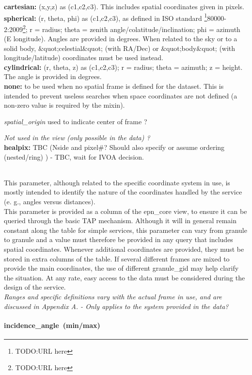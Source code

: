 \documentclass[11pt,a4paper]{ivoa}
\begin{document}
\textbf{cartesian:} (x,y,z) as (c1,c2,c3). This includes spatial coordinates given in pixels.\\ \textbf{spherical:} (r, theta, phi) as (c1,c2,c3), as defined in ISO standard \footnote{TODO:URL here}80000-2:2009\footnote{TODO:URL here}; r = radius; theta = zenith angle/colatitude/inclination; phi = azimuth (E longitude). Angles are provided in degrees. When related to the sky or to a solid body, \&quot;celestial\&quot; (with RA/Dec) or \&quot;body\&quot; (with longitude/latitude) coordinates must be used instead. \\\textbf{cylindrical:} (r, theta, z) as (c1,c2,c3); r = radius; theta = azimuth; z = height. The angle is provided in degrees.\\\textbf{none:} to be used when no spatial frame is defined for the dataset. This is intended to prevent useless searches when space coordinates are not defined (a non-zero value is required by the mixin).

\emph{spatial\_origin} used to indicate center of frame ?

\emph{Not used in the view (only possible in the data) ?}\\ \textbf{healpix:} TBC (Nside and pixel\#? Should also specify or assume ordering (nested/ring) ) - TBC, wait for IVOA decision.

\\ This parameter, although related to the specific coordinate system in use, is mostly intended to identify the nature of the coordinates handled by the service (e. g., angles versus distances).\\ This parameter is provided as a column of the epn\_core view, to ensure it can be queried through the basic TAP mechanism. Although it will in general remain constant along the table for simple services, this parameter can vary from granule to granule and a value must therefore be provided in any query that includes spatial coordinates. Whenever additional coordinates are provided, they must be stored in extra columns of the table. If several different frames are mixed to provide the main coordinates, the use of different granule\_gid may help clarify the situation. At any rate, easy access to the data must be considered during the design of the service. \\\emph{ Ranges and specific definitions vary with the actual frame in use, and are discussed in Appendix A. - Only applies to the system provided in the data?} 

\paragraph{incidence\_angle (min/max)}
\end{document}
